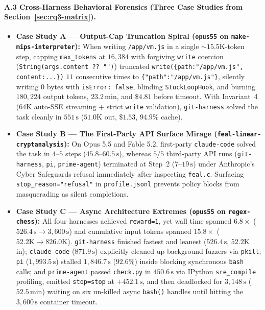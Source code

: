 \documentclass[11pt]{article}
\newcommand{\code}[1]{\nolinkurl{#1}}
\begin{document}
\paragraph{A.3 Cross-Harness Behavioral Forensics (Three Case Studies from Section~\ref{sec:rq3-matrix}).}
\begin{itemize}[leftmargin=*,nosep]
  \item \textbf{Case Study A --- Output-Cap Truncation Spiral (\code{opus55} on \code{make-mips-interpreter}):} When writing \texttt{/app/vm.js} in a single $\sim 15.5\mathrm{K}$-token step, capping \texttt{max\_tokens} at $16{,}384$ with forgiving \texttt{write} coercion (\texttt{String(args.content ?? "")}) truncated \texttt{write(\{path:"/app/vm.js", content:...\})} $11$ consecutive times to \texttt{\{"path":"/app/vm.js"\}}, silently writing $0$ bytes with \texttt{isError: false}, blinding \texttt{StuckLoopHook}, and burning $180{,}224$ output tokens, $23.2\,\mathrm{min}$, and $\$4.81$ before timeout. With Invariant~4 ($64\mathrm{K}$ auto-SSE streaming + strict \texttt{write} validation), \texttt{git-harness} solved the task cleanly in $551\,\mathrm{s}$ ($51.0\mathrm{K}$ out, $\$1.53$, $94.9\%$ cache).
  \item \textbf{Case Study B --- The First-Party API Surface Mirage (\code{feal-linear-cryptanalysis}):} On Opus 5.5 and Fable 5.2, first-party \texttt{claude-code} solved the task in $4\text{--}5$ steps ($45.8\text{--}60.5\,\mathrm{s}$), whereas $5/5$ third-party API runs (\texttt{git-harness}, \texttt{pi}, \texttt{prime-agent}) terminated at Step~2 ($7\text{--}19\,\mathrm{s}$) under Anthropic's Cyber Safeguards refusal immediately after inspecting \texttt{feal.c}. Surfacing \texttt{stop\_reason="refusal"} in \texttt{profile.jsonl} prevents policy blocks from masquerading as silent completions.
  \item \textbf{Case Study C --- Async Architecture Extremes (\code{opus55} on \code{regex-chess}):} All four harnesses achieved \texttt{reward=1}, yet wall time spanned $6.8\times$ ($526.4\,\mathrm{s} \to 3{,}600\,\mathrm{s}$) and cumulative input tokens spanned $15.8\times$ ($52.2\mathrm{K} \to 826.0\mathrm{K}$). \texttt{git-harness} finished fastest and leanest ($526.4\,\mathrm{s}$, $52.2\mathrm{K}$ in); \texttt{claude-code} ($871.9\,\mathrm{s}$) explicitly cleaned up background fuzzers via \texttt{pkill}; \texttt{pi} ($1{,}993.5\,\mathrm{s}$) stalled $1{,}846.7\,\mathrm{s}$ ($92.6\%$) inside blocking synchronous \texttt{bash} calls; and \texttt{prime-agent} passed \texttt{check.py} in $450.6\,\mathrm{s}$ via IPython \texttt{sre\_compile} profiling, emitted \texttt{stop=stop} at $+452.1\,\mathrm{s}$, and then deadlocked for $3{,}148\,\mathrm{s}$ ($52.5\,\mathrm{min}$) waiting on six un-killed async \texttt{bash()} handles until hitting the $3{,}600\,\mathrm{s}$ container timeout.
\end{itemize}
\end{document}

